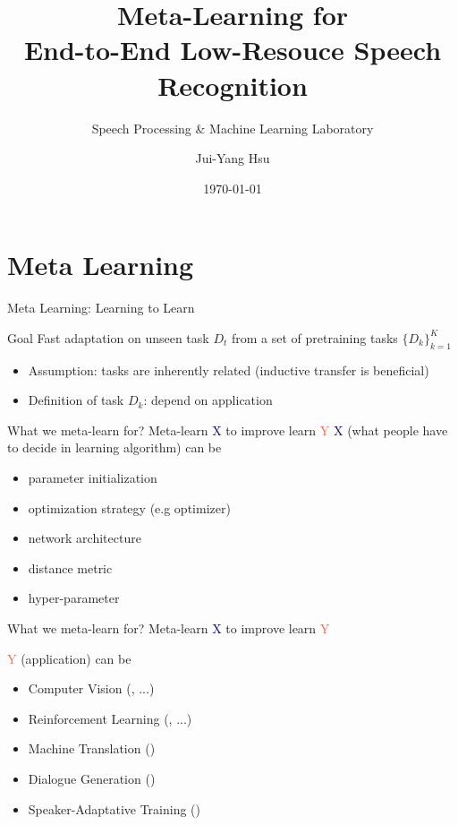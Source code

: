 \documentclass{beamer}
\title{Meta-Learning for\\ End-to-End Low-Resouce Speech Recognition}
\subtitle{\textcolor[rgb]{0.00,0.50,1.00}{{Speech Processing \& Machine Learning Laboratory}}}
\author{Jui-Yang Hsu}
\date{\today}
\begin{document}
\begin{frame}
\maketitle
\end{frame}

\section{Meta Learning}
\begin{frame}[t]{Meta Learning: Learning to Learn}
  \begin{block}{Goal}
    Fast adaptation on unseen task $D_t$ from a set of pretraining tasks $\{ D_k\}^{K}_{k=1}$ 
  \end{block}

  \pause 

  \begin{itemize}
    \item Assumption: tasks are inherently related (inductive transfer is beneficial)
    \item Definition of task $D_k$: depend on application
  \end{itemize}
\end{frame}

\begin{frame}[t]{What we meta-learn for?}
  \centering Meta-learn \textcolor{navy}{X} to improve learn \textcolor{tomato}{Y}
  \pause
  \flushleft \textcolor{navy}{X} (what people have to decide in learning algorithm) can be
  \begin{itemize}
    \item parameter initialization
    \item optimization strategy (e.g optimizer)
    \item network architecture
    \item distance metric
    \item hyper-parameter
  \end{itemize}
\end{frame}

\begin{frame}[t]{What we meta-learn for?}
  \centering Meta-learn \textcolor{navy}{X} to improve learn \textcolor{tomato}{Y}

  \flushleft \textcolor{tomato}{Y} (application) can be
  \begin{itemize}
    \item Computer Vision (\citealt{snell2017prototypical}, \citealt{rusu2018meta} ...)
    \item Reinforcement Learning (\citealt{eysenbach2018diversity}, \citealt{xu2018meta} ...)
    \item Machine Translation (\citealt{gu2018meta})
    \item Dialogue Generation (\citealt{mi2019meta})
    \item Speaker-Adaptative Training (\citealt{klejch2019speaker})
  \end{itemize}
\end{frame}
\end{document}
